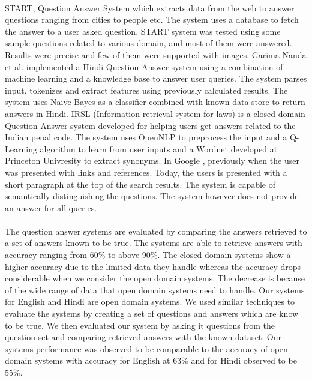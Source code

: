 \paragraph{}
START, Question Answer System \cite{katz1997annotating} which extracts data from the web to answer questions ranging from cities to people etc. The system uses a database to fetch the answer to a user asked question. START system was tested using some sample questions related to various domain, and most of them were answered. Results were precise and few of them were supported with images. Garima Nanda et al. implemented a Hindi Question Answer system \cite{nanda2016Hindi} using a combination of machine learning and a knowledge base to answer user queries. The system parses input, tokenizes and extract features using previously calculated results. The system uses  Naive Bayes as a classifier combined with known data store to return answers in Hindi. IRSL (Information retrieval system for laws) \cite {sangeetha2017information} is a closed domain Question Answer system developed for helping users get answers related to the Indian penal code. The system uses OpenNLP to preprocess the input and a Q-Learning algorithm to learn from user inputs and a Wordnet developed at Princeton Univresity to extract synonyms. In Google \cite {alupului2016question}, previously when the user was presented with links and references. Today, the users is presented with a short paragraph at the top of the search results. The system is capable of semantically distinguishing the questions. The system however does not provide an answer for all queries. 

\paragraph{}
The question answer systems are evaluated by comparing the answers retrieved to a set of answers known to be true. The systems are able to retrieve answers with accuracy ranging from 60\% to above 90\%. The closed domain systems show a higher accuracy due to the limited data they handle whereas the accuracy drops considerable when we consider the open domain systems. The decrease is because of the wide range of data that open domain systems need to handle. Our systems for English and Hindi are open domain systems. We used similar techniques to evaluate the systems by creating a set of questions and answers which are know to be true. We then evaluated our system by asking it questions from the question set and comparing retrieved answers with the known dataset. Our systems performance was observed to be comparable to the accuracy of open domain systems with accuracy for English at 63\% and for Hindi observed to be 55\%.

